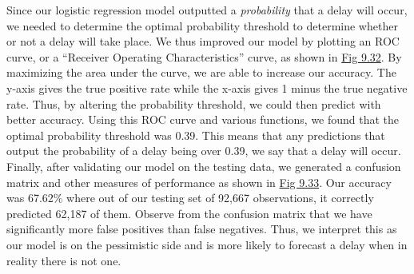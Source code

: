 \documentclass[12pt, a4paper, openany]{book}
\newcommand\tab[1][1cm]{\hspace*{#1}}
\begin{document}
	\tab Since our logistic regression model outputted a \textit{probability} that a delay will occur, we needed to determine the optimal probability threshold to determine whether or not a delay will take place. We thus improved our model by plotting an ROC curve, or a “Receiver Operating Characteristics” curve, as shown in \underline{Fig 9.32}. By maximizing the area under the curve, we are able to increase our accuracy. The y-axis gives the true positive rate while the x-axis gives 1 minus the true negative rate. Thus, by altering the probability threshold, we could then predict with better accuracy. Using this ROC curve and various functions, we found that the optimal probability threshold was 0.39. This means that any predictions that output the probability of a delay being over 0.39, we say that a delay will occur. \\

	\tab Finally, after validating our model on the testing data, we generated a confusion matrix and other measures of performance as shown in \underline{Fig 9.33}. Our accuracy was 67.62\% where out of our testing set of 92,667 observations, it correctly predicted 62,187 of them. Observe from the confusion matrix that we have significantly more false positives than false negatives. Thus, we interpret this as our model is on the pessimistic side and is more likely to forecast a delay when in reality there is not one. \\

\end{document}
